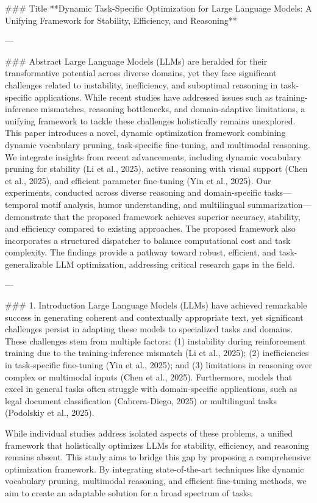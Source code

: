 ### Title  
**Dynamic Task-Specific Optimization for Large Language Models: A Unifying Framework for Stability, Efficiency, and Reasoning**

---

### Abstract  
Large Language Models (LLMs) are heralded for their transformative potential across diverse domains, yet they face significant challenges related to instability, inefficiency, and suboptimal reasoning in task-specific applications. While recent studies have addressed issues such as training-inference mismatches, reasoning bottlenecks, and domain-adaptive limitations, a unifying framework to tackle these challenges holistically remains unexplored. This paper introduces a novel, dynamic optimization framework combining dynamic vocabulary pruning, task-specific fine-tuning, and multimodal reasoning. We integrate insights from recent advancements, including dynamic vocabulary pruning for stability (Li et al., 2025), active reasoning with visual support (Chen et al., 2025), and efficient parameter fine-tuning (Yin et al., 2025). Our experiments, conducted across diverse reasoning and domain-specific tasks—temporal motif analysis, humor understanding, and multilingual summarization—demonstrate that the proposed framework achieves superior accuracy, stability, and efficiency compared to existing approaches. The proposed framework also incorporates a structured dispatcher to balance computational cost and task complexity. The findings provide a pathway toward robust, efficient, and task-generalizable LLM optimization, addressing critical research gaps in the field.

---

### 1. Introduction  
Large Language Models (LLMs) have achieved remarkable success in generating coherent and contextually appropriate text, yet significant challenges persist in adapting these models to specialized tasks and domains. These challenges stem from multiple factors: (1) instability during reinforcement training due to the training-inference mismatch (Li et al., 2025); (2) inefficiencies in task-specific fine-tuning (Yin et al., 2025); and (3) limitations in reasoning over complex or multimodal inputs (Chen et al., 2025). Furthermore, models that excel in general tasks often struggle with domain-specific applications, such as legal document classification (Cabrera-Diego, 2025) or multilingual tasks (Podolskiy et al., 2025).

While individual studies address isolated aspects of these problems, a unified framework that holistically optimizes LLMs for stability, efficiency, and reasoning remains absent. This study aims to bridge this gap by proposing a comprehensive optimization framework. By integrating state-of-the-art techniques like dynamic vocabulary pruning, multimodal reasoning, and efficient fine-tuning methods, we aim to create an adaptable solution for a broad spectrum of tasks.

